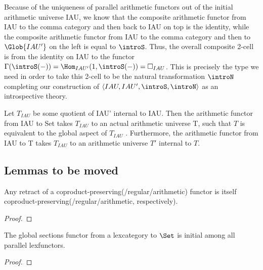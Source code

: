 \begin{construction}
Because of the uniqueness of parallel arithmetic functors out of the initial arithmetic universe IAU, we know that the composite arithmetic functor from IAU to the comma category and then back to IAU on top is the identity, while the composite arithmetic functor from IAU to the comma category and then to $\Glob{IAU'}$ on the left is equal to $\introS$. Thus, the overall composite 2-cell is from the identity on IAU to the functor $\Gamma(\introS(-)) = \Hom_{IAU'}(1, \introS(-)) = \Box_{IAU}$. This is precisely the type we need in order to take this 2-cell to be the natural transformation $\introN$ completing our construction of $\langle IAU, IAU', \introS, \introN \rangle$ as an introspective theory.
\end{construction}



Let $T_{IAU}$ be some quotient of IAU' internal to IAU. Then the arithmetic functor from IAU to Set takes $T_{IAU}$ to an actual arithmetic universe T, such that $T$ is equivalent to the global aspect of $T_{IAU}$ . Furthermore, the arithmetic functor from IAU to T takes $T_{IAU}$ to an arithmetic universe $T'$ internal to $T$.

\subsection{Lemmas to be moved}

\begin{theorem}\label{RetractIsCocontinuousEtc}
Any retract of a coproduct-preserving(/regular/arithmetic) functor is itself coproduct-preserving(/regular/arithmetic, respectively).
\end{theorem}
\begin{proof}
\TODO
\end{proof}

\begin{theorem}\label{TermModelIsInitialForLex}
The global sections functor from a lexcategory to $\Set$ is initial among all parallel lexfunctors.
\end{theorem}
\begin{proof}
\TODO
\end{proof}

